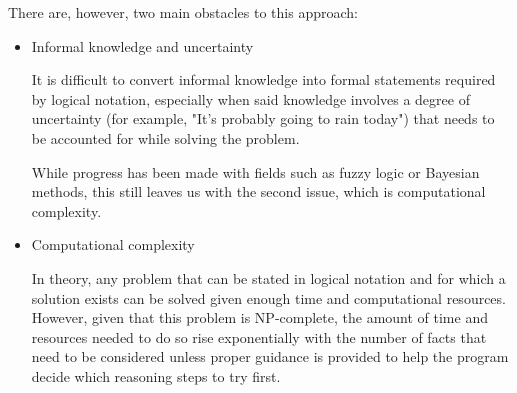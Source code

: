 \documentclass[masterthesis]{fer}
\begin{document}
There are, however, two main obstacles to this approach:

\begin{itemize}
\item{Informal knowledge and uncertainty}

It is difficult to convert informal knowledge into formal statements required by logical notation, especially when said knowledge involves a degree of uncertainty (for example, "It's probably going to rain today") that needs to be accounted for while solving the problem.

While progress has been made with fields such as fuzzy logic or Bayesian methods, this still leaves us with the second issue, which is computational complexity.

\item{Computational complexity}

In theory, any problem that can be stated in logical notation and for which a solution exists can be solved given enough time and computational resources.
However, given that this problem is NP-complete, the amount of time and resources needed to do so rise exponentially with the number of facts that need to be considered unless proper guidance is provided to help the program decide which reasoning steps to try first.
\end{itemize}
\end{document}
